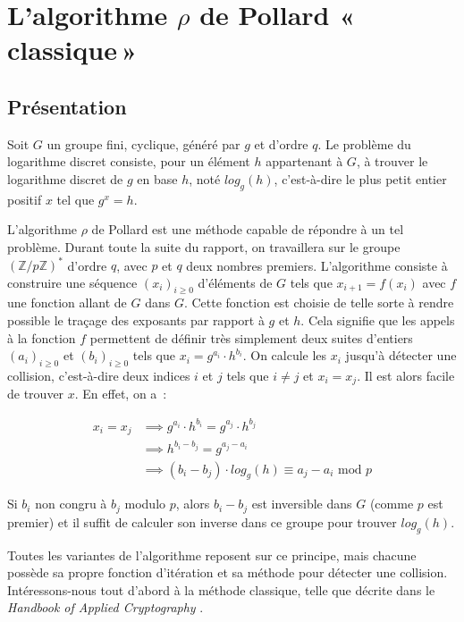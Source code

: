 \chapter{L'algorithme \texorpdfstring{$\rho$}{Rho} de Pollard «\texorpdfstring{\,}{\ }classique\texorpdfstring{\,}{\ }»}
    	\section{Présentation}
    	Soit $G$ un groupe fini, cyclique, généré par $g$ et d'ordre $q$. Le problème du logarithme discret consiste, pour un élément $h$ appartenant à $G$, à trouver le logarithme discret de $g$ en base $h$, noté $log_g(h)$, c'est-à-dire le plus petit entier positif $x$ tel que $g^x = h$.
    	
    	L'algorithme $\rho$ de Pollard est une méthode capable de répondre à un tel problème. Durant toute la suite du rapport, on travaillera sur le groupe $(\mathbb{Z}/p\mathbb{Z})^*$ d'ordre $q$, avec $p$ et $q$ deux nombres premiers. L'algorithme consiste à construire une séquence $(x_i)_{i \ge 0}$ d'éléments de $G$ tels que $x_{i+1} = f(x_i)$ avec $f$ une fonction allant de $G$ dans $G$. Cette fonction est choisie de telle sorte à rendre possible le traçage des exposants par rapport à $g$ et $h$. Cela signifie que les appels à la fonction $f$ permettent de définir très simplement deux suites d'entiers $(a_i)_{i \ge 0}$ et $(b_i)_{i \ge 0}$ tels que $x_i = g^{a_i} \cdot h^{b_i}$. On calcule les $x_i$ jusqu'à détecter une collision, c'est-à-dire deux indices $i$ et $j$ tels que $i \ne j$ et $x_i = x_j$. Il est alors facile de trouver $x$. En effet, on a~:
    	
    	\begin{align*}
          x_i = x_j &\implies g^{a_i} \cdot h^{b_i} = g^{a_j} \cdot h^{b_j} \\
                    &\implies h^{b_i - b_j} = g^{a_j - a_i} \\
                    &\implies (b_i - b_j) \cdot log_g(h) \equiv a_j - a_i \text{\ mod } p
        \end{align*}
        
        Si $b_i$ non congru à $b_j$ modulo $p$, alors $b_i - b_j$ est inversible dans $G$ (comme $p$ est premier) et il suffit de calculer son inverse dans ce groupe pour trouver $log_g(h)$.   	
    	
    	Toutes les variantes de l'algorithme reposent sur ce principe, mais chacune possède sa propre fonction d'itération et sa méthode pour détecter une collision. Intéressons-nous tout d'abord à la méthode classique, telle que décrite dans le \textit{Handbook of Applied Cryptography} \autocite[106]{handbook}.

